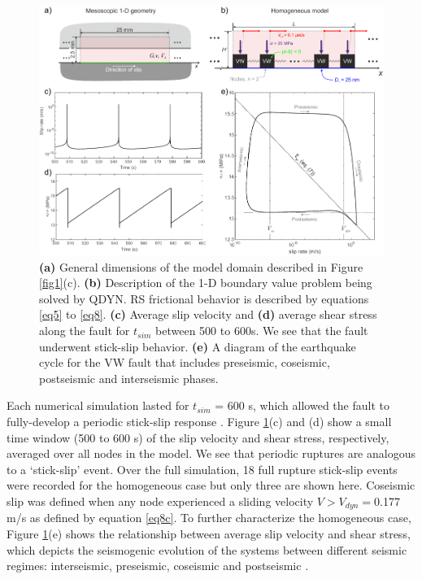 \documentclass[preprint,1p, 10pt,authoryear]{elsarticle}
\begin{document}
\begin{figure}
	\centering
	\includegraphics{FIG5_revised.pdf} 
	\caption{\textbf{(a)} General dimensions of the model domain described in Figure \ref{fig1}(c). \textbf{(b)} Description of the 1-D boundary value problem being solved by QDYN.  RS frictional behavior is described by equations \eqref{eq5} to \eqref{eq8}. \textbf{(c)} Average slip velocity and \textbf{(d)} average shear stress along the fault for $t_{sim}$ between 500 to 600s. We see that the fault underwent stick-slip behavior. \textbf{(e)} A diagram of the earthquake cycle for the VW fault that includes preseismic, coseismic, postseismic and interseismic phases.}
	\label{fig5}
\end{figure}

Each numerical simulation lasted for $t_{sim}$ = 600 s, which allowed the fault to fully-develop a periodic stick-slip response \citep{Hillers2007}.  Figure \ref{fig5}(c) and (d) show a small time window (500 to 600 s) of the slip velocity and shear stress, respectively, averaged over all nodes in the model.  We see that periodic ruptures are analogous to a `stick-slip' event. Over the full simulation, 18 full rupture stick-slip events were recorded for the homogeneous case but only three are shown here.  Coseismic slip was defined when any node experienced a sliding velocity $V > V_{dyn}=$0.177 m/s as defined by equation \eqref{eq8c}. To further characterize the homogeneous case, Figure \ref{fig5}(e) shows the relationship between average slip velocity and shear stress, which depicts the seismogenic evolution of the systems between different seismic regimes: interseismic, preseismic, coseismic and postseismic \citep{Ampuero2008}.
\end{document}
